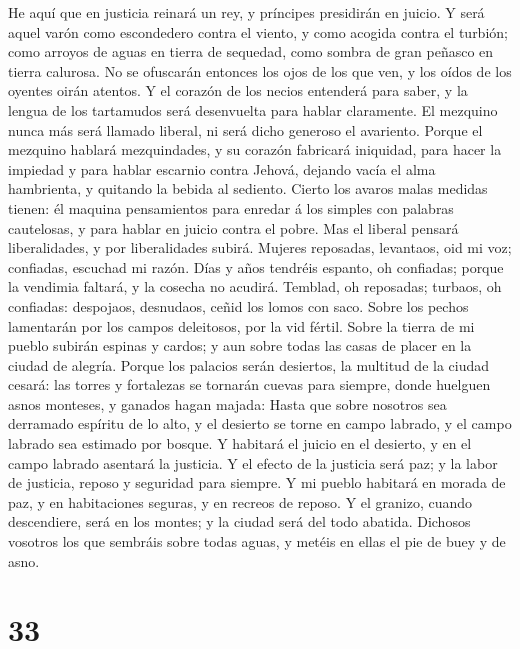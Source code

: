  He aquí que en justicia reinará un rey, y príncipes
presidirán en juicio.  Y será aquel varón como escondedero
contra el viento, y como acogida contra el turbión; como arroyos de
aguas en tierra de sequedad, como sombra de gran peñasco en tierra
calurosa.  No se ofuscarán entonces los ojos de los que
ven, y los oídos de los oyentes oirán atentos.  Y el
corazón de los necios entenderá para saber, y la lengua de los
tartamudos será desenvuelta para hablar claramente.  El
mezquino nunca más será llamado liberal, ni será dicho generoso el
avariento.  Porque el mezquino hablará mezquindades, y su
corazón fabricará iniquidad, para hacer la impiedad y para hablar
escarnio contra Jehová, dejando vacía el alma hambrienta, y quitando la
bebida al sediento.  Cierto los avaros malas medidas
tienen: él maquina pensamientos para enredar á los simples con palabras
cautelosas, y para hablar en juicio contra el pobre.  Mas
el liberal pensará liberalidades, y por liberalidades subirá.
 Mujeres reposadas, levantaos, oid mi voz; confiadas,
escuchad mi razón.  Días y años tendréis espanto, oh
confiadas; porque la vendimia faltará, y la cosecha no acudirá.
 Temblad, oh reposadas; turbaos, oh confiadas: despojaos,
desnudaos, ceñid los lomos con saco.  Sobre los pechos
lamentarán por los campos deleitosos, por la vid fértil. 
Sobre la tierra de mi pueblo subirán espinas y cardos; y aun sobre todas
las casas de placer en la ciudad de alegría.  Porque los
palacios serán desiertos, la multitud de la ciudad cesará: las torres y
fortalezas se tornarán cuevas para siempre, donde huelguen asnos
monteses, y ganados hagan majada:  Hasta que sobre
nosotros sea derramado espíritu de lo alto, y el desierto se torne en
campo labrado, y el campo labrado sea estimado por bosque.
 Y habitará el juicio en el desierto, y en el campo
labrado asentará la justicia.  Y el efecto de la justicia
será paz; y la labor de justicia, reposo y seguridad para siempre.
 Y mi pueblo habitará en morada de paz, y en habitaciones
seguras, y en recreos de reposo.  Y el granizo, cuando
descendiere, será en los montes; y la ciudad será del todo abatida.
 Dichosos vosotros los que sembráis sobre todas aguas, y
metéis en ellas el pie de buey y de asno.

\hypertarget{section-32}{%
\section{33}\label{section-32}}

